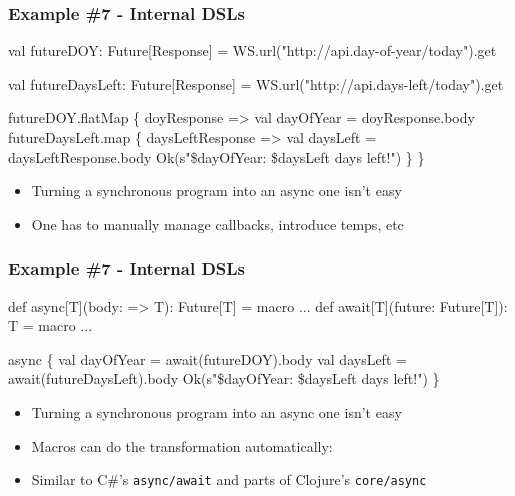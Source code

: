 \documentclass[svgnames,hyperref={bookmarks=false}]{beamer}
\begin{document}
\begin{frame}[fragile, t]
\frametitle{Example \#7 - Internal DSLs}

\begin{semiverbatim}
val futureDOY: Future[Response] =
  WS.url("http://api.day-of-year/today").get

val futureDaysLeft: Future[Response] =
  WS.url("http://api.days-left/today").get

futureDOY.flatMap \{ doyResponse =>
  val dayOfYear = doyResponse.body
  futureDaysLeft.map \{ daysLeftResponse =>
    val daysLeft = daysLeftResponse.body
    Ok(s"\$dayOfYear: \$daysLeft days left!")
  \}
\}
\end{semiverbatim}

\begin{itemize}
\item Turning a synchronous program into an async one isn't easy
\item One has to manually manage callbacks, introduce temps, etc
\end{itemize}
\end{frame}

\begin{frame}[fragile, t]
\frametitle{Example \#7 - Internal DSLs}

\begin{semiverbatim}
\alert{def async[T](body: => T): Future[T] = macro ...}
\alert{def await[T](future: Future[T]): T = macro ...}

\alert{async \{}
  val dayOfYear = \alert{await(}futureDOY\alert{)}.body
  val daysLeft = \alert{await(}futureDaysLeft\alert{)}.body
  Ok(s"\$dayOfYear: \$daysLeft days left!")
\alert{\}}



\end{semiverbatim}

\begin{itemize}
\item Turning a synchronous program into an async one isn't easy
\item Macros can do the transformation automatically: 
\item Similar to C\#'s \texttt{async/await} and parts of Clojure's \texttt{core/async}
\end{itemize}
\end{frame}
\end{document}
